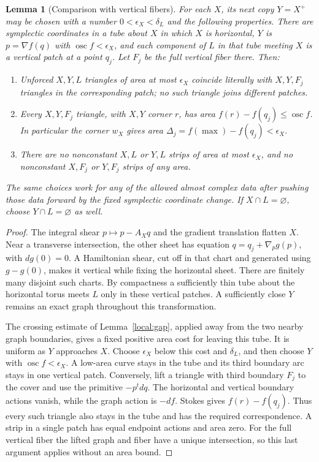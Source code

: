 \documentclass[11pt]{article}
\newtheorem{lemma}[theorem]{Lemma}
\theoremstyle{definition}
\theoremstyle{remark}
\numberwithin{equation}{section}
\begin{document}
\begin{lemma}[Comparison with vertical fibers]\label{local:comparison}
For each $X$, its next copy $Y=X^+$ may be chosen with a number
$0<\epsilon_X<\delta_L$ and the following properties.  There are symplectic
coordinates in a tube about $X$ in which $X$ is horizontal, $Y$ is
$p=\nabla f(q)$ with $\operatorname{osc}f<\epsilon_X$, and each component
of $L$ in that tube meeting $X$ is a vertical patch at a point $q_j$.
Let $F_j$ be the full vertical fiber there.  Then:
\begin{enumerate}[label=(\roman*)]
\item Unforced $X,Y,L$ triangles of area at most $\epsilon_X$ coincide
literally with $X,Y,F_j$ triangles in the corresponding patch; no such
triangle joins different patches.
\item Every $X,Y,F_j$ triangle, with $X,Y$ corner $r$, has area
$f(r)-f(q_j)\leq\operatorname{osc}f$.  In particular the corner $w_X$
gives area $\Delta_j=f(\max)-f(q_j)<\epsilon_X$.
\item There are no nonconstant $X,L$ or $Y,L$ strips of area at most
$\epsilon_X$, and no nonconstant $X,F_j$ or $Y,F_j$ strips of any area.
\end{enumerate}
The same choices work for any of the allowed almost complex data after
pushing those data forward by the fixed symplectic coordinate change.
If $X\cap L=\varnothing$, choose $Y\cap L=\varnothing$ as well.
\end{lemma}
\begin{proof}
The integral shear $p\mapsto p-A_Xq$ and the gradient translation flatten
$X$.  Near a transverse intersection, the other sheet has equation
$q=q_j+\nabla_pg(p)$, with $dg(0)=0$.  A Hamiltonian shear, cut off in that
chart and generated using $g-g(0)$, makes it vertical while fixing the
horizontal sheet.  There are finitely many disjoint such charts.  By
compactness a sufficiently thin tube about the horizontal torus meets
$L$ only in these vertical patches.  A sufficiently close $Y$ remains an
exact graph throughout this transformation.

The crossing estimate of Lemma~\ref{local:gap}, applied away from the two
nearby graph boundaries, gives a fixed positive area cost for leaving
this tube.  It is uniform as $Y$ approaches $X$.  Choose $\epsilon_X$
below this cost and $\delta_L$, and then choose $Y$ with
$\operatorname{osc}f<\epsilon_X$.  A low-area curve stays in the tube and
its third boundary arc stays in one vertical patch.  Conversely, lift a
triangle with third boundary $F_j$ to the cover and use the primitive
$-p^tdq$.  The horizontal and vertical boundary actions vanish, while
the graph action is $-df$.  Stokes gives $f(r)-f(q_j)$.  Thus every such
triangle also stays in the tube and has the required correspondence.
A strip in a single patch has equal endpoint actions and area zero.
For the full vertical fiber the lifted graph and fiber have a unique
intersection, so this last argument applies without an area bound.
\end{proof}
\end{document}
